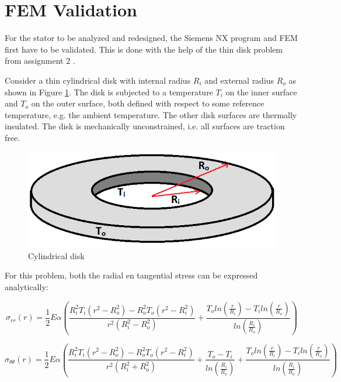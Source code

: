 \clearpage
\section{FEM Validation}
\label{AppendixC}

For the stator to be analyzed and redesigned, the Siemens NX program and FEM first have to be validated. This is done with the help of the thin disk problem from assignment 2 \cite{assignment2}.

Consider a thin cylindrical disk with internal radius $R_i$ and external radius $R_o$ as shown in Figure \ref{cylindrical_disk}. The disk is subjected to a temperature $T_i$ on the inner surface and $T_o$ on the outer surface, both defined with respect to some reference temperature, e.g. the ambient temperature. The other disk surfaces are thermally insulated. The disk is mechanically unconstrained, i.e. all surfaces are traction free.

\begin{figure}[H]
\centering
\includegraphics[width=0.5\linewidth]{Figures/kaulovettedisc.png}
\caption{Cylindrical disk}
\label{cylindrical_disk}
\end{figure}
For this problem, both the radial en tangential stress can be expressed analytically:

\begin{equation}
\label{rr}
\sigma_{rr}(r) = \frac{1}{2}E \alpha (\frac{R_{i}^{2}T_{i}(r^{2}-R_{o}^{2})-R_{o}^{2}T_{o}(r^{2}-R_{i}^{2})}{r^{2}(R_{i}^{2}-R_{o}^{2})} + \frac{T_{o}ln(\frac{r}{R_{i}})-T_{i}ln(\frac{r}{R_{o}})}{ln(\frac{R_{i}}{R_{o}})})
\end{equation}

\begin{equation}
\label{theta}
\sigma_{\theta\theta}(r) = \frac{1}{2}E \alpha (\frac{R_{i}^{2}T_{i}(r^{2}-R_{o}^{2})-R_{o}^{2}T_{o}(r^{2}-R_{i}^{2})}{r^{2}(R_{i}^{2} + R_{o}^{2})} + \frac{T_{o}-T_{i}}{ln(\frac{R_{i}}{R_{o}})} + \frac{T_{o}ln(\frac{r}{R_{i}})-T_{i}ln(\frac{r}{R_{o}})}{ln(\frac{R_{i}}{R_{o}})})
\end{equation}

